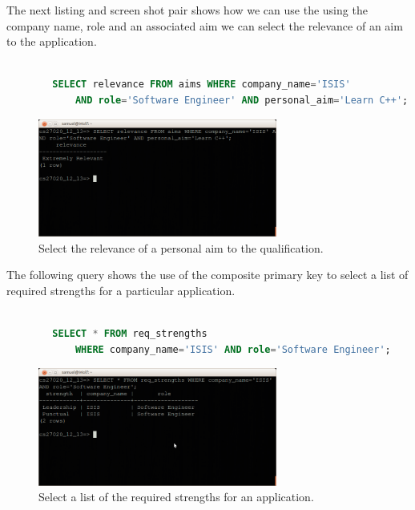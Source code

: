 \documentclass{article}
\begin{document}
The next listing and screen shot pair shows how we can use the using the company name, role and an associated aim we can select the relevance of an aim to the application.

\begin{center}
	\begin{lstlisting}[language=sql, showstringspaces=false]

		SELECT relevance FROM aims WHERE company_name='ISIS' 
			AND role='Software Engineer' AND personal_aim='Learn C++';

	\end{lstlisting}
\end{center}

\begin{figure}[H]
\centering
\includegraphics[width=0.7\textwidth]{img/test/test-select-relevance.png}
\caption{Select the relevance of a personal aim to the qualification.}
\label{fig:test-select-relevance}
\end{figure}

The following query shows the use of the composite primary key to select a list of required strengths for a particular application.

\begin{center}
	\begin{lstlisting}[language=sql, showstringspaces=false]

		SELECT * FROM req_strengths
			WHERE company_name='ISIS' AND role='Software Engineer';

	\end{lstlisting}
\end{center}

\begin{figure}[H]
\centering
\includegraphics[width=0.7\textwidth]{img/test/test-req-strengths.png}
\caption{Select a list of the required strengths for an application.}
\label{fig:test-req-strengths}
\end{figure}
\end{document}
